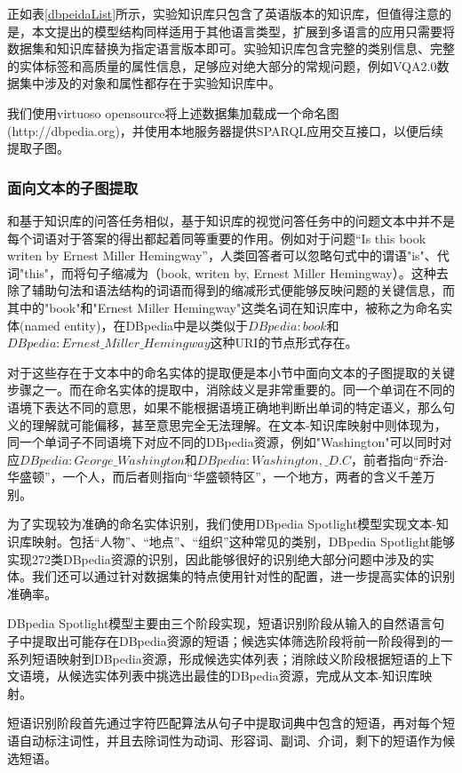 正如表\ref{dbpeidaList}所示，实验知识库只包含了英语版本的知识库，但值得注意的是，本文提出的模型结构同样适用于其他语言类型，扩展到多语言的应用只需要将数据集和知识库替换为指定语言版本即可。实验知识库包含完整的类别信息、完整的实体标签和高质量的属性信息，足够应对绝大部分的常规问题，例如VQA2.0数据集中涉及的对象和属性都存在于实验知识库中。

我们使用virtuoso opensource将上述数据集加载成一个命名图(http://dbpedia.org)，并使用本地服务器提供SPARQL应用交互接口，以便后续提取子图。

\subsubsection{面向文本的子图提取}
和基于知识库的问答任务相似，基于知识库的视觉问答任务中的问题文本中并不是每个词语对于答案的得出都起着同等重要的作用。例如对于问题“Is this book writen by Ernest Miller Hemingway”，人类回答者可以忽略句式中的谓语"is"、代词"this"，而将句子缩减为（book, writen by, Ernest Miller Hemingway）。这种去除了辅助句法和语法结构的词语而得到的缩减形式便能够反映问题的关键信息，而其中的"book"和"Ernest Miller Hemingway"这类名词在知识库中，被称之为命名实体(named entity)，在DBpedia中是以类似于$DBpedia:book$和$DBpedia:Ernest\_Miller\_Hemingway$这种URI的节点形式存在。

对于这些存在于文本中的命名实体的提取便是本小节中面向文本的子图提取的关键步骤之一。而在命名实体的提取中，消除歧义是非常重要的。同一个单词在不同的语境下表达不同的意思，如果不能根据语境正确地判断出单词的特定语义，那么句义的理解就可能偏移，甚至意思完全无法理解。在文本-知识库映射中则体现为，同一个单词子不同语境下对应不同的DBpedia资源，例如"Washington"可以同时对应$DBpedia:George\_Washington$和$DBpedia:Washington,\_D.C$，前者指向“乔治-华盛顿”，一个人，而后者则指向“华盛顿特区”，一个地方，两者的含义千差万别。

为了实现较为准确的命名实体识别，我们使用DBpedia Spotlight模型实现文本-知识库映射。包括“人物”、“地点”、“组织”这种常见的类别，DBpedia Spotlight能够实现272类DBpedia资源的识别，因此能够很好的识别绝大部分问题中涉及的实体。我们还可以通过针对数据集的特点使用针对性的配置，进一步提高实体的识别准确率。

DBpedia Spotlight模型主要由三个阶段实现，短语识别阶段从输入的自然语言句子中提取出可能存在DBpedia资源的短语；候选实体筛选阶段将前一阶段得到的一系列短语映射到DBpedia资源，形成候选实体列表；消除歧义阶段根据短语的上下文语境，从候选实体列表中挑选出最佳的DBpedia资源，完成从文本-知识库映射。

短语识别阶段首先通过字符匹配算法从句子中提取词典中包含的短语，再对每个短语自动标注词性，并且去除词性为动词、形容词、副词、介词，剩下的短语作为候选短语。

